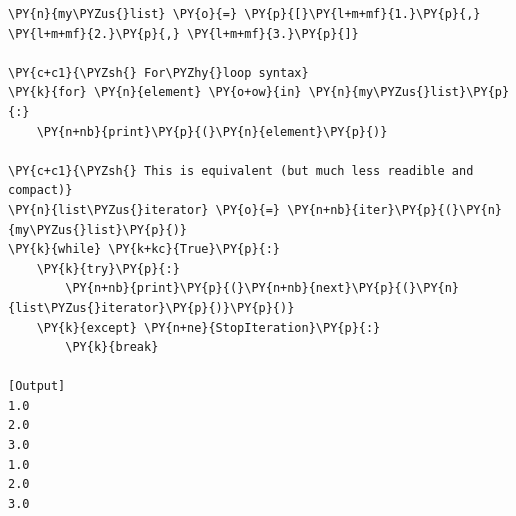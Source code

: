 \begin{Verbatim}[label=\makebox{\url{https://github.com/lucabaldini/cmepda/tree/master/slides/latex/snippets/show\_iterator.py}},commandchars=\\\{\}]
\PY{n}{my\PYZus{}list} \PY{o}{=} \PY{p}{[}\PY{l+m+mf}{1.}\PY{p}{,} \PY{l+m+mf}{2.}\PY{p}{,} \PY{l+m+mf}{3.}\PY{p}{]}

\PY{c+c1}{\PYZsh{} For\PYZhy{}loop syntax}
\PY{k}{for} \PY{n}{element} \PY{o+ow}{in} \PY{n}{my\PYZus{}list}\PY{p}{:}
    \PY{n+nb}{print}\PY{p}{(}\PY{n}{element}\PY{p}{)}

\PY{c+c1}{\PYZsh{} This is equivalent (but much less readible and compact)}
\PY{n}{list\PYZus{}iterator} \PY{o}{=} \PY{n+nb}{iter}\PY{p}{(}\PY{n}{my\PYZus{}list}\PY{p}{)}
\PY{k}{while} \PY{k+kc}{True}\PY{p}{:}
    \PY{k}{try}\PY{p}{:}
        \PY{n+nb}{print}\PY{p}{(}\PY{n+nb}{next}\PY{p}{(}\PY{n}{list\PYZus{}iterator}\PY{p}{)}\PY{p}{)}
    \PY{k}{except} \PY{n+ne}{StopIteration}\PY{p}{:}
        \PY{k}{break}

[Output]
1.0
2.0
3.0
1.0
2.0
3.0
\end{Verbatim}